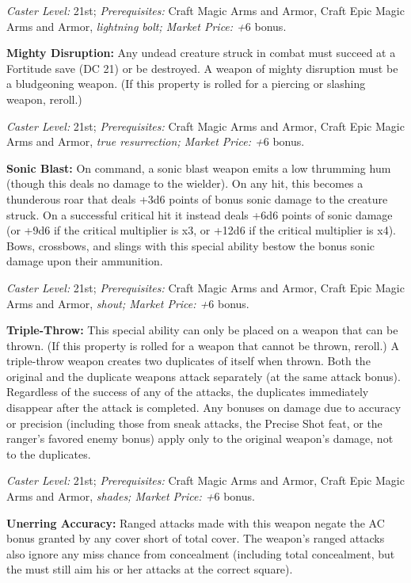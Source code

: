 \documentclass{article}
\begin{document}
\textit{Caster Level: }21st; \textit{Prerequisites: }Craft Magic Arms and Armor, 
Craft Epic Magic Arms and Armor, \textit{lightning bolt; Market Price: +}6 bonus. 

\textbf{Mighty Disruption: }Any undead creature struck in combat must succeed at 
a Fortitude save (DC 21) or be destroyed. A weapon of mighty disruption must be 
a bludgeoning weapon. (If this property is rolled for a piercing or slashing weapon, 
reroll.) 

\textit{Caster Level: }21st; \textit{Prerequisites: }Craft Magic Arms and Armor, 
Craft Epic Magic Arms and Armor, \textit{true resurrection; Market Price: +}6 bonus. 

\textbf{Sonic Blast: }On command, a sonic blast weapon emits a low thrumming hum 
(though this deals no damage to the wielder). On any hit, this becomes a thunderous 
roar that deals +3d6 points of bonus sonic damage to the creature struck. On a 
successful critical hit it instead deals +6d6 points of sonic damage (or +9d6 if 
the critical multiplier is x3, or +12d6 if the critical multiplier is x4). Bows, 
crossbows, and slings with this special ability bestow the bonus sonic damage upon 
their ammunition. 

\textit{Caster Level: }21st; \textit{Prerequisites: }Craft Magic Arms and Armor, 
Craft Epic Magic Arms and Armor, \textit{shout; Market Price: +}6 bonus. 

\textbf{Triple-Throw: }This special ability can only be placed on a weapon that 
can be thrown. (If this property is rolled for a weapon that cannot be thrown, 
reroll.) A triple-throw weapon creates two duplicates of itself when thrown. Both 
the original and the duplicate weapons attack separately (at the same attack bonus). 
Regardless of the success of any of the attacks, the duplicates immediately disappear 
after the attack is completed. Any bonuses on damage due to accuracy or precision 
(including those from sneak attacks, the Precise Shot feat, or the ranger's favored 
enemy bonus) apply only to the original weapon's damage, not to the duplicates. 

\textit{Caster Level: }21st; \textit{Prerequisites: }Craft Magic Arms and Armor, 
Craft Epic Magic Arms and Armor, \textit{shades; Market Price: +}6 bonus. 

\textbf{Unerring Accuracy: }Ranged attacks made with this weapon negate the AC 
bonus granted by any cover short of total cover.  The weapon's ranged attacks also 
ignore any miss chance from concealment (including total concealment, but the must 
still aim his or her attacks at the correct square). 
\end{document}
